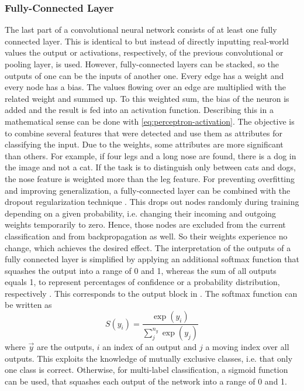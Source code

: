 \subsubsection{Fully-Connected Layer}
\label{sec:cnn-fully-connected}
The last part of a convolutional neural network consists of at least one fully connected layer.
This is identical to  but instead of directly inputting real-world values the output or activations, respectively, of the previous convolutional or pooling layer, is used.
However, fully-connected layers can be stacked, so the outputs of one can be the inputs of another one.
Every edge has a weight and every node has a bias.
The values flowing over an edge are multiplied with the related weight and summed up.
To this weighted sum, the bias of the neuron is added and the result is fed into an activation function.
Describing this in a mathematical sense can be done with \eqref{eq:perceptron-activation}.
The objective is to combine several features that were detected and use them as attributes for classifying the input.
Due to the weights, some attributes are more significant than others.
For example, if four legs and a long nose are found, there is a dog in the image and not a cat.
If the task is to distinguish only between cats and dogs, the nose feature is weighted more than the leg feature.
For preventing overfitting and improving generalization, a fully-connected layer can be combined with the dropout regularization technique \cite{Srivastava:2014:DSW:2627435.2670313}.
This drops out nodes randomly during training depending on a given probability, i.e. changing their incoming and outgoing weights temporarily to zero.
Hence, those nodes are excluded from the current classification and from backpropagation as well.
So their weights experience no change, which achieves the desired effect.
The interpretation of the outputs of a fully connected layer is simplified by applying an additional softmax function that squashes the output into a range of 0 and 1, whereas the sum of all outputs equals 1, to represent percentages of confidence or a probability distribution, respectively \cite{Bishop2006}.
This corresponds to the output block in .
The softmax function can be written as
\begin{equation}
	\label{eq:softmax}
	S(y_i) = \frac{\exp(y_i)}{\sum_{j}^{n_y} \exp(y_j)}
\end{equation}
where $\vec{y}$ are the outputs, $i$ an index of an output and $j$ a moving index over all outputs.
This exploits the knowledge of mutually exclusive classes, i.e. that only one class is correct.
Otherwise, for multi-label classification, a sigmoid function can be used, that squashes each output of the network into a range of 0 and 1.